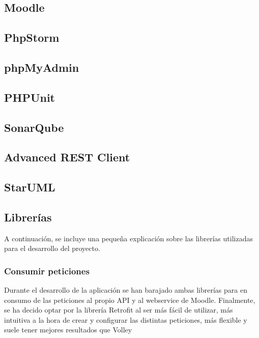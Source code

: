 \subsection{Moodle}
\subsection{PhpStorm}
\subsection{phpMyAdmin}
\subsection{PHPUnit}
\subsection{SonarQube}
\subsection{Advanced REST Client}
\subsection{StarUML}
\subsection{Librerías}

A continuación, se incluye una pequeña explicación sobre las librerías utilizadas para el desarrollo del proyecto.

\subsubsection{Consumir peticiones}

Durante el desarrollo de la aplicación se han barajado ambas librerías para en consumo de las peticiones al propio API y al webservice de Moodle. Finalmente, se ha decido optar por la librería Retrofit al ser más fácil de utilizar, más intuitiva a la hora de crear y configurar las distintas peticiones, más flexible y suele tener mejores resultados que Volley


